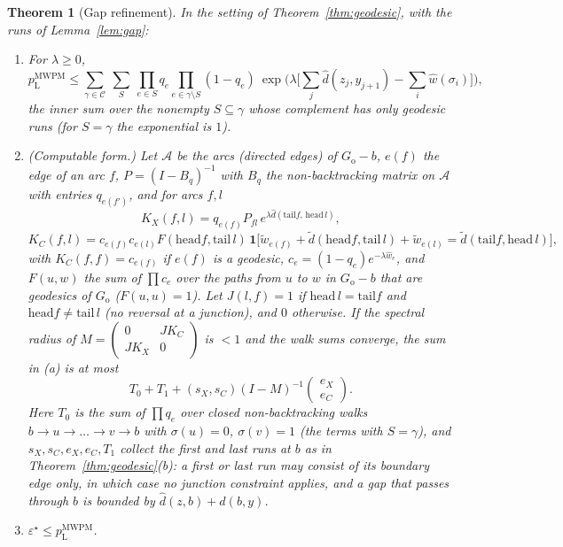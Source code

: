 \documentclass[11pt]{article}
\theoremstyle{plain}
\newtheorem{theorem}{Theorem}
\theoremstyle{definition}
\theoremstyle{remark}
\newcommand{\pM}{p_{\mathrm{L}}^{\mathrm{MWPM}}}
\newcommand{\err}{\varepsilon^{\star}}
\newcommand{\Go}{G_{\mathrm{o}}}
\newcommand{\cC}{\mathcal{C}}
\newcommand{\tw}{\tilde w}
\newcommand{\hw}{\hat w}
\newcommand{\td}{\tilde d}
\newcommand{\hd}{\hat d}
\newcommand{\one}{\mathbf 1}
\renewcommand{\_}{\oldunderscore\allowbreak}
\begin{document}
\begin{theorem}[Gap refinement]\label{thm:gap}
In the setting of Theorem~\ref{thm:geodesic}, with the runs of Lemma~\ref{lem:gap}:
\begin{enumerate}[label=(\alph*),leftmargin=*]
\item For $\lambda\ge0$,
\[
\pM\le\sum_{\gamma\in\cC}\ \sum_{S}\ \prod_{e\in S}q_e\prod_{e\in\gamma\setminus S}(1-q_e)\ \exp\Big(\lambda\Big[\sum_j\hd(z_j,y_{j+1})-\sum_i\hw(\sigma_i)\Big]\Big),
\]
the inner sum over the nonempty $S\subseteq\gamma$ whose complement has only geodesic runs (for $S=\gamma$ the exponential is $1$).
\item (Computable form.) Let $\mathcal A$ be the arcs (directed edges) of $\Go-b$, $e(f)$ the edge of an arc $f$, $P=(I-B_q)^{-1}$ with $B_q$ the non-backtracking matrix on $\mathcal A$ with entries $q_{e(f')}$, and for arcs $f,l$
\[
K_X(f,l)=q_{e(f)}P_{fl}\,e^{\lambda\hd(\mathrm{tail}f,\,\mathrm{head}\,l)},\]
\[K_C(f,l)=c_{e(f)}c_{e(l)}F(\mathrm{head}f,\mathrm{tail}\,l)\,\one\big[\tw_{e(f)}+\td(\mathrm{head}f,\mathrm{tail}\,l)+\tw_{e(l)}=\td(\mathrm{tail}f,\mathrm{head}\,l)\big],
\]
with $K_C(f,f)=c_{e(f)}$ if $e(f)$ is a geodesic, $c_e=(1-q_e)e^{-\lambda\hw_e}$, and $F(u,w)$ the sum of $\prod c_e$ over the paths from $u$ to $w$ in $\Go-b$ that are geodesics of $\Go$ ($F(u,u)=1$). Let $J(l,f)=1$ if $\mathrm{head}\,l=\mathrm{tail}f$ and $\mathrm{head}f\ne\mathrm{tail}\,l$ (no reversal at a junction), and $0$ otherwise. If the spectral radius of $M=\begin{pmatrix}0&JK_C\\JK_X&0\end{pmatrix}$ is $<1$ and the walk sums converge, the sum in (a) is at most
\[
T_0+T_1+(s_X,s_C)(I-M)^{-1}\begin{pmatrix}e_X\\e_C\end{pmatrix}.
\]
Here $T_0$ is the sum of $\prod q_e$ over closed non-backtracking walks $b\to u\to\dots\to v\to b$ with $\sigma(u)=0$, $\sigma(v)=1$ (the terms with $S=\gamma$), and $s_X,s_C,e_X,e_C,T_1$ collect the first and last runs at $b$ as in Theorem~\ref{thm:geodesic}(b): a first or last run may consist of its boundary edge only, in which case no junction constraint applies, and a gap that passes through $b$ is bounded by $\hd(z,b)+\hd(b,y)$.
\item $\err\le\pM$.
\end{enumerate}
\end{theorem}
\end{document}
